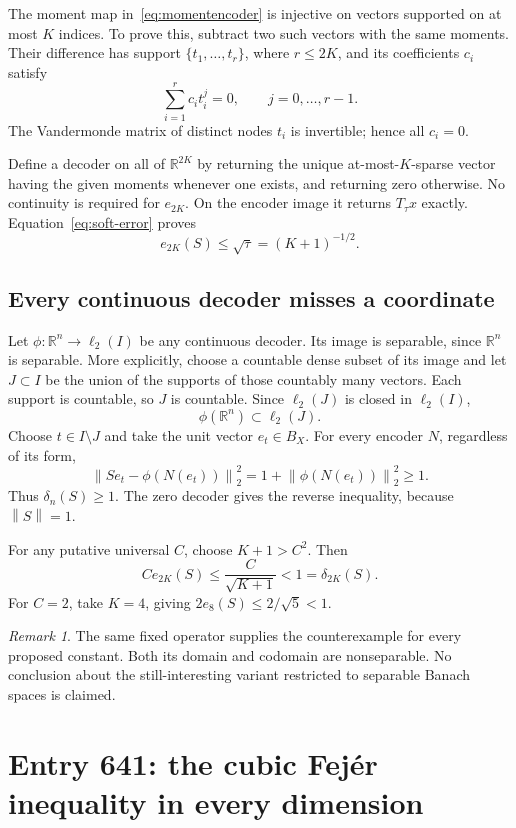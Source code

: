 \documentclass[11pt,a4paper]{article}
\theoremstyle{remark}
\newtheorem{remark}[theorem]{Remark}
\newcommand{\R}{\mathbb R}
\newcommand{\norm}[1]{\left\lVert #1\right\rVert}
\begin{document}
The moment map in~\eqref{eq:momentencoder} is injective on vectors supported on at most $K$ indices. To prove this, subtract two such vectors with the same moments. Their difference has support $\{t_1,\ldots,t_r\}$, where $r\le2K$, and its coefficients $c_i$ satisfy
\[
 \sum_{i=1}^r c_i t_i^j=0,\qquad j=0,\ldots,r-1.
\]
The Vandermonde matrix of distinct nodes $t_i$ is invertible; hence all $c_i=0$.

Define a decoder on all of $\R^{2K}$ by returning the unique at-most-$K$-sparse vector having the given moments whenever one exists, and returning zero otherwise. No continuity is required for $e_{2K}$. On the encoder image it returns $T_\tau x$ exactly. Equation~\eqref{eq:soft-error} proves
\[
 e_{2K}(S)\le\sqrt\tau=(K+1)^{-1/2}.
\]

\subsection{Every continuous decoder misses a coordinate}

Let $\phi:\R^n\to\ell_2(I)$ be any continuous decoder. Its image is separable, since $\R^n$ is separable. More explicitly, choose a countable dense subset of its image and let $J\subset I$ be the union of the supports of those countably many vectors. Each support is countable, so $J$ is countable. Since $\ell_2(J)$ is closed in $\ell_2(I)$,
\[
 \phi(\R^n)\subset\ell_2(J).
\]
Choose $t\in I\setminus J$ and take the unit vector $e_t\in B_X$. For every encoder $N$, regardless of its form,
\[
 \norm{Se_t-\phi(N(e_t))}_2^2
 =1+\norm{\phi(N(e_t))}_2^2\ge1.
\]
Thus $\delta_n(S)\ge1$. The zero decoder gives the reverse inequality, because $\norm S=1$.

For any putative universal $C$, choose $K+1>C^2$. Then
\[
 C e_{2K}(S)\le\frac{C}{\sqrt{K+1}}<1=\delta_{2K}(S).
\]
For $C=2$, take $K=4$, giving $2e_8(S)\le2/\sqrt5<1$.

\begin{remark}
The same fixed operator supplies the counterexample for every proposed constant. Both its domain and codomain are nonseparable. No conclusion about the still-interesting variant restricted to separable Banach spaces is claimed.
\end{remark}

\newpage
\section{Entry 641: the cubic Fej\'er inequality in every dimension}\label{sec:cubic}
\end{document}
